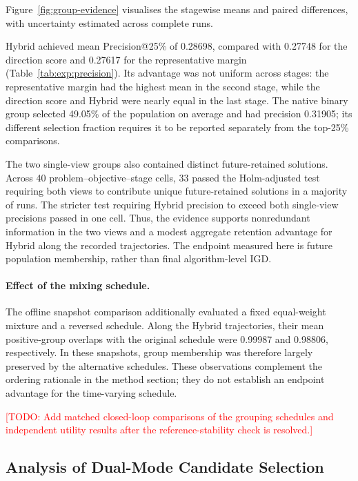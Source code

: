 \documentclass[final,5p,times,twocolumn]{elsarticle}
\newcommand{\TODO}[1]{\textcolor{red}{[TODO: #1]}}
\begin{document}
Figure~\ref{fig:group-evidence} visualises the stagewise means and paired
differences, with uncertainty estimated across complete runs.


Hybrid achieved mean Precision@25\% of 0.28698, compared with 0.27748
for the direction score and 0.27617 for the representative margin
(Table~\ref{tab:exp:precision}). Its advantage was not uniform across
stages: the representative margin had the highest mean in the second
stage, while the direction score and Hybrid were nearly equal in the
last stage. The native binary group selected 49.05\% of the population
on average and had precision 0.31905; its different selection fraction
requires it to be reported separately from the top-25\% comparisons.

The two single-view groups also contained distinct future-retained
solutions. Across 40 problem--objective--stage cells, 33 passed the
Holm-adjusted test requiring both views to contribute unique
future-retained solutions in a majority of runs. The stricter test
requiring Hybrid precision to exceed both single-view precisions passed
in one cell. Thus, the evidence supports nonredundant information in the
two views and a modest aggregate retention advantage for Hybrid along
the recorded trajectories. The endpoint measured here is future
population membership, rather than final algorithm-level IGD.

\paragraph{Effect of the mixing schedule.}
The offline snapshot comparison additionally evaluated a fixed
equal-weight mixture and a reversed schedule. Along the Hybrid
trajectories, their mean positive-group overlaps with the original
schedule were 0.99987 and 0.98806, respectively. In these snapshots,
group membership was therefore largely preserved by the alternative
schedules. These observations complement the ordering rationale in the
method section; they do not establish an endpoint advantage for the
time-varying schedule.

\TODO{Add matched closed-loop comparisons of the grouping schedules and
independent utility results after the reference-stability check is resolved.}

\subsection{Analysis of Dual-Mode Candidate Selection}
\label{sec:exp:candidate}
\end{document}
